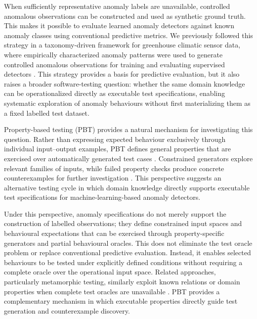 \documentclass[preprint,12pt]{elsarticle}
\begin{document}
When sufficiently representative anomaly labels are unavailable, controlled
anomalous observations can be constructed and used as synthetic ground
truth. This makes it possible to evaluate learned anomaly detectors against
known anomaly classes using conventional predictive metrics. We previously
followed this strategy in a taxonomy-driven framework for greenhouse
climatic sensor data, where empirically characterized anomaly patterns were
used to generate controlled anomalous observations for training and
evaluating supervised detectors \cite{carrero2026ifac}. This strategy
provides a basis for predictive evaluation, but it also raises a broader
software-testing question: whether the same domain knowledge can be
operationalized directly as executable test specifications, enabling
systematic exploration of anomaly behaviours without first materializing
them as a fixed labelled test dataset.

Property-based testing (PBT) provides a natural mechanism for investigating
this question. Rather than expressing expected behaviour exclusively through
individual input--output examples, PBT defines general properties that are
exercised over automatically generated test cases
\cite{claessen2000quickcheck,almendros2017automatic}. Constrained generators
explore relevant families of inputs, while failed property checks produce
concrete counterexamples for further investigation
\cite{almendros2017automatic,goldstein2024pbt}. This perspective suggests an
alternative testing cycle in which domain knowledge directly supports
executable test specifications for machine-learning-based anomaly detectors.

Under this perspective, anomaly specifications do not merely support the
construction of labelled observations; they define constrained input spaces
and behavioural expectations that can be exercised through property-specific
generators and partial behavioural oracles. This does not eliminate the test
oracle problem or replace conventional predictive evaluation. Instead, it
enables selected behaviours to be tested under explicitly defined conditions
without requiring a complete oracle over the operational input space. Related
approaches, particularly metamorphic testing, similarly exploit known
relations or domain properties when complete test oracles are unavailable
\cite{segura2016metamorphic,riccio2020testing}. PBT provides a complementary
mechanism in which executable properties directly guide test generation and
counterexample discovery.
\end{document}
